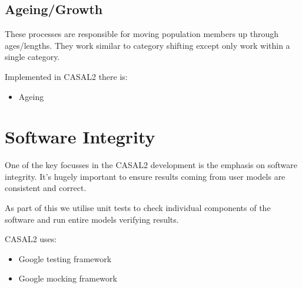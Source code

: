 \documentclass[a4paper,11pt,twoside,pdftex,draft]{article}
\providecommand{\tightlist}{%
  \setlength{\itemsep}{0pt}\setlength{\parskip}{0pt}}
\begin{document}
\hypertarget{ageinggrowth}{%
\subsection[Ageing/Growth]{\texorpdfstring{\protect\hypertarget{anchor-40}{}{}Ageing/Growth}{Ageing/Growth}}\label{ageinggrowth}}

These processes are responsible for moving population members up through
ages/lengths. They work similar to category shifting except only work
within a single category.

Implemented in CASAL2 there is:

\begin{itemize}
\tightlist
\item
  Ageing
\end{itemize}

\hypertarget{software-integrity}{%
\section[Software
Integrity]{\texorpdfstring{\protect\hypertarget{anchor-41}{}{}Software
Integrity}{Software Integrity}}\label{software-integrity}}

One of the key focusses in the CASAL2 development is the emphasis on
software integrity. It's hugely important to ensure results coming from
user models are consistent and correct.

As part of this we utilise unit tests to check individual components of
the software and run entire models verifying results.

CASAL2 uses:

\begin{itemize}
\tightlist
\item
  Google testing framework
\item
  Google mocking framework
\end{itemize}
\end{document}
